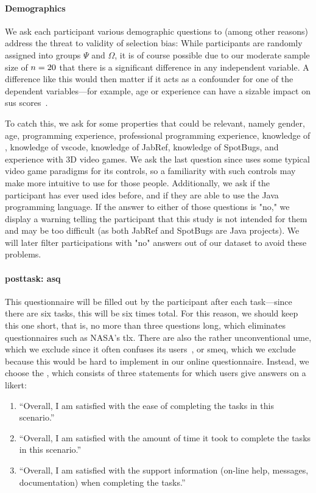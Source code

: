 \documentclass[../thesis]{subfiles}
\begin{document}
\paragraph{Demographics}
We ask each participant various demographic questions to (among other reasons) address the threat to validity of selection bias:
While participants are randomly assigned into groups $\Psi$ and $\Omega$, it is of course possible due to our moderate sample size of $n = 20$ that there is a significant difference in any independent variable.
A difference like this would then matter if it acts as a confounder for one of the dependent variables---for example, age or experience can have a sizable impact on \gls{sus} scores~\cites[585]{bangor2008}{mclellan2012}.

To catch this, we ask for some properties that could be relevant, namely
gender, age, programming experience, professional programming experience, knowledge of \SEE{}, knowledge of \gls{vscode}, knowledge of JabRef, knowledge of SpotBugs, and experience with 3D video games.
We ask the last question since \SEE{} uses some typical video game paradigms for its controls, so a familiarity with such controls may make \SEE{} more intuitive to use for those people.
Additionally, we ask if the participant has ever used \glspl{ide} before, and if they are able to use the Java programming language.
If the answer to either of those questions is "no," we display a warning telling the participant that this study is not intended for them and may be too difficult (as both JabRef and SpotBugs are Java projects).
We will later filter participations with "no" answers out of our dataset to avoid these problems.

\paragraph{\Gls{posttask}: \gls{asq}}
This questionnaire will be filled out by the participant after each task---since there are six tasks, this will be six times total.
For this reason, we should keep this one short, that is, no more than three questions long, which eliminates questionnaires such as NASA's \gls{tlx}.
There are also the rather unconventional \gls{ume}, which we exclude since it often confuses its users~\cite[1607--1608]{sauro2009b}, or \gls{smeq}, which we exclude because this would be hard to implement in our online questionnaire.
Instead, we choose the \emph{}, which consists of three statements for which users give answers on a \gls{likert}:
\begin{enumerate}
	\item \enquote{Overall, I am satisfied with the ease of completing the tasks in this scenario.}
	\item \enquote{Overall, I am satisfied with the amount of time it took to complete the tasks in this scenario.}
	\item \enquote{Overall, I am satisfied with the support information (on-line help, messages, documentation) when completing the tasks.}
\end{enumerate}
\end{document}
